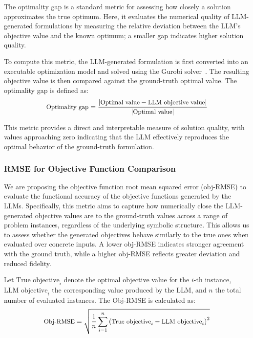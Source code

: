 \documentclass[review,12pt]{elsarticle}
\begin{document}
The optimality gap is a standard metric for assessing how closely a solution approximates the true optimum. Here, it evaluates the numerical quality of LLM-generated formulations by measuring the relative deviation between the LLM’s objective value and the known optimum; a smaller gap indicates higher solution quality.

To compute this metric, the LLM-generated formulation is first converted into an executable optimization model and solved using the Gurobi solver~\cite{gurobi_solver}. The resulting objective value is then compared against the ground-truth optimal value. The optimality gap is defined as:
\begin{equation}
\small
\text{Optimality gap} = \frac{|\text{Optimal value} - \text{LLM objective value}|}{|\text{Optimal value}|}
\label{eq:optimality_gap}
\end{equation}

This metric provides a direct and interpretable measure of solution quality, with values approaching zero indicating that the LLM effectively reproduces the optimal behavior of the ground-truth formulation.


\subsubsection{RMSE for Objective Function Comparison}\label{rmse}

We are proposing the objective function root mean squared error (obj-RMSE) to evaluate the functional accuracy of the objective functions generated by the LLMs. Specifically, this metric aims to capture how numerically close the LLM-generated objective values are to the ground-truth values across a range of problem instances, regardless of the underlying symbolic structure. This allows us to assess whether the generated objectives behave similarly to the true ones when evaluated over concrete inputs. A lower obj-RMSE indicates stronger agreement with the ground truth, while a higher obj-RMSE reflects greater deviation and reduced fidelity.

Let $\text{True objective}_i$ denote the optimal objective value for the $i$-th instance, $\text{LLM objective}_i$ the corresponding value produced by the LLM, and $n$ the total number of evaluated instances. The Obj-RMSE is calculated as:
\begin{equation}
\small
\text{Obj-RMSE} = \sqrt{\frac{1}{n} \sum_{i=1}^{n} \left(\text{True objective}_i - \text{LLM objective}_i\right)^2}
\label{eq:rmse}
\end{equation}
\end{document}
